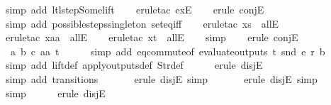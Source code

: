 \begin{isabellebody}
\ {\isacharparenleft}simp\ add{\isacharcolon}\ ltl{\isacharunderscore}step{\isacharunderscore}Some{\isacharunderscore}lift{\isacharparenright}\isanewline
\ \ \isamarkupfalse%
\ {\isacharparenleft}erule{\isacharunderscore}tac\ exE{\isacharparenright}\isanewline
\ \ \isamarkupfalse%
\ {\isacharparenleft}erule\ conjE{\isacharparenright}{\isacharplus}\isanewline
\ \ \isamarkupfalse%
\ {\isacharparenleft}simp\ add{\isacharcolon}\ possible{\isacharunderscore}steps{\isacharunderscore}singleton\ set{\isacharunderscore}eq{\isacharunderscore}iff{\isacharparenright}\isanewline
\ \ \isamarkupfalse%
\ {\isacharparenleft}erule{\isacharunderscore}tac\ x{\isacharequal}s\ \ allE{\isacharparenright}\isanewline
\ \ \isamarkupfalse%
\ {\isacharparenleft}erule{\isacharunderscore}tac\ x{\isacharequal}aa\ \ allE{\isacharparenright}\isanewline
\ \ \isamarkupfalse%
\ {\isacharparenleft}erule{\isacharunderscore}tac\ x{\isacharequal}t\ \ allE{\isacharparenright}\isanewline
\ \ \isamarkupfalse%
\ simp\isanewline
\ \ \isamarkupfalse%
\ {\isacharparenleft}erule\ conjE{\isacharparenright}{\isacharplus}\isanewline
\ \ \isamarkupfalse%
\ \ a\ b\ c\ aa\ t\isanewline
\ \ \ \ \isamarkupfalse%
\ {\isacharparenleft}simp\ add{\isacharcolon}\ eq{\isacharunderscore}commute{\isacharbrackleft}of\ {\isachardoublequoteopen}evaluate{\isacharunderscore}outputs\ t\ {\isacharparenleft}snd\ e{\isacharparenright}\ r{\isachardoublequoteclose}\ b{\isacharbrackright}{\isacharparenright}\isanewline
\ \ \ \ \isamarkupfalse%
\ {\isacharparenleft}simp\ add{\isacharcolon}\ lift{\isacharunderscore}def\ apply{\isacharunderscore}outputs{\isacharunderscore}def\ Str{\isacharunderscore}def{\isacharparenright}\isanewline
\ \ \ \ \isamarkupfalse%
\ {\isacharparenleft}erule\ disjE{\isacharparenright}\isanewline
\ \ \ \ \ \isamarkupfalse%
\ {\isacharparenleft}simp\ add{\isacharcolon}\ transitions{\isacharparenright}\isanewline
\ \ \ \ \ \isamarkupfalse%
\ {\isacharparenleft}erule\ disjE{\isacharcomma}\ simp{\isacharparenright}\isanewline
\ \ \ \ \ \isamarkupfalse%
\ {\isacharparenleft}erule\ disjE{\isacharcomma}\ simp{\isacharparenright}\isanewline
\ \ \ \ \ \isamarkupfalse%
\ simp\isanewline
\ \ \ \ \isamarkupfalse%
\ {\isacharparenleft}erule\ disjE{\isacharparenright}\isanewline

\end{isabellebody}
